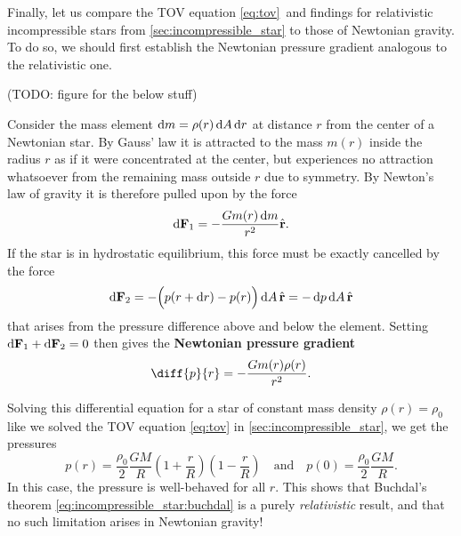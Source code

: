 Finally, let us compare the TOV equation \eqref{eq:tov} and findings for relativistic incompressible stars from \cref{sec:incompressible_star} to those of Newtonian gravity.
To do so, we should first establish the Newtonian pressure gradient analogous to the relativistic one.

(TODO: figure for the below stuff)

Consider the mass element $\mathop{}\!\mathrm{d} m = \rho(r) \mathop{}\!\mathrm{d} A \mathop{}\!\mathrm{d} r$ at distance $r$ from the center of a Newtonian star.
By Gauss' law it is attracted to the mass $m(r)$ inside the radius $r$ as if it were concentrated at the center, but experiences no attraction whatsoever from the remaining mass outside $r$ due to symmetry.
By Newton's law of gravity it is therefore pulled upon by the force
\begin{equation}
	\mathop{}\!\mathrm{d} \mathbf{F}_1 = -\frac{G m(r) \mathop{}\!\mathrm{d} m}{r^2} \hat{\textbf{r}} .
	\label{eq:weak_field_limit:force_newton}
\end{equation}
If the star is in hydrostatic equilibrium, this force must be exactly cancelled by the force
\begin{equation}
	\mathop{}\!\mathrm{d} \textbf{F}_2 = - \Big( p(r + \mathop{}\!\mathrm{d} r) - p(r) \Big) \mathop{}\!\mathrm{d} A \, \hat{\textbf{r}} = -\mathop{}\!\mathrm{d} p \mathop{}\!\mathrm{d} A \, \hat{\textbf{r}}
	\label{eq:weak_field_limit:force_pressure}
\end{equation}
that arises from the pressure difference above and below the element.
Setting $\mathop{}\!\mathrm{d} \textbf{F}_1 + \mathop{}\!\mathrm{d} \textbf{F}_2 = 0$ then gives the \textbf{Newtonian pressure gradient}
\begin{equation}
	\diff{p}{r} = -\frac{G m(r) \rho(r)}{r^2} .
	\label{eq:weak_field_limit:newtonian_pressure_gradient}
\end{equation}

Solving this differential equation for a star of constant mass density $\rho(r) = \rho_0$ like we solved the TOV equation \eqref{eq:tov} in \cref{sec:incompressible_star}, we get the pressures
\begin{equation}
	p(r) = \frac{\rho_0}{2} \frac{G M}{R} \left( 1 + \frac{r}{R} \right) \left( 1 - \frac{r}{R} \right)
	\quad \text{and} \quad
	p(0) = \frac{\rho_0}{2} \frac{GM}{R} .
	\label{eq:weak_field_limit:newtonian_pressure}
\end{equation}
In this case, the pressure is well-behaved for all $r$.
This shows that Buchdal's theorem \eqref{eq:incompressible_star:buchdal} is a purely \emph{relativistic} result, and that no such limitation arises in Newtonian gravity!



